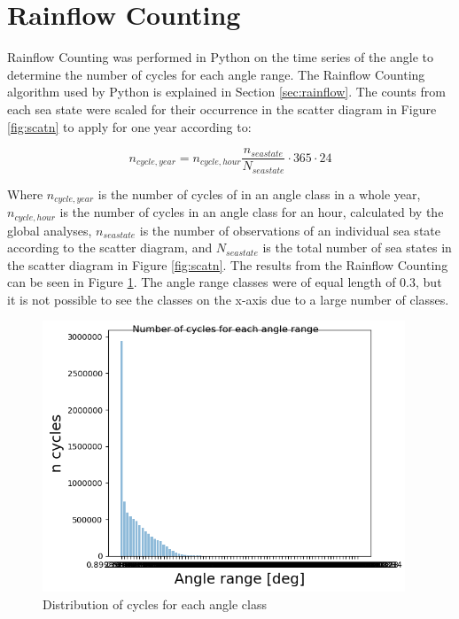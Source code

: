 \section{Rainflow Counting}
 Rainflow Counting was performed in Python on the time series of the angle to determine the number of cycles for each angle range. The Rainflow Counting algorithm used by Python is explained in Section \ref{sec:rainflow}. The counts from each sea state were scaled for their occurrence in the scatter diagram in Figure \ref{fig:scatn} to apply for one year according to:

\begin{equation}
    n_{cycle,year}=n_{cycle,hour} \frac{n_{seastate}}{N_{seastate}} \cdot 365 \cdot 24 
\end{equation}

\noindent Where $n_{cycle,year}$ is the number of cycles of in an angle class in a whole year, $n_{cycle,hour}$ is the number of cycles in an angle class for an hour, calculated by the global analyses, $n_{seastate}$ is the number of observations of an individual sea state according to the scatter diagram, and $N_{seastate}$ is the total number of sea states in the scatter diagram in Figure \ref{fig:scatn}.\newline
\newline 
\noindent The results from the Rainflow Counting can be seen in Figure \ref{fig:initialcyc}. The angle range classes were of equal length of 0.3, but it is not possible to see the classes on the x-axis due to a large number of classes.

\begin{figure}[H]
\centering
\includegraphics[scale=0.9]{figures/initialcyc}
\caption[$\; \:$Distribution of cycles for each angle class]{Distribution of cycles for each angle class}
 \label{fig:initialcyc}
\end{figure}

